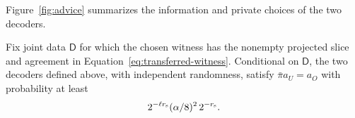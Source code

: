 Figure~\ref{fig:advice} summarizes the information and private choices of
the two decoders.

\FloatBarrier

\begin{lemma}
\label{lem:fourier-coset-decoding}
Fix joint data $\mathsf D$ for which the chosen witness has the nonempty
projected slice and agreement in Equation~\eqref{eq:transferred-witness}.
Conditional on $\mathsf D$, the two decoders defined above, with independent
randomness, satisfy $\bar\pi a_U=a_O$ with probability at least
\begin{equation}
 2^{-\ell r_{\rm s}}(\alpha/8)^2\,2^{-r_{\rm s}}.
 \label{eq:conditional-decoding}
\end{equation}
\end{lemma}

